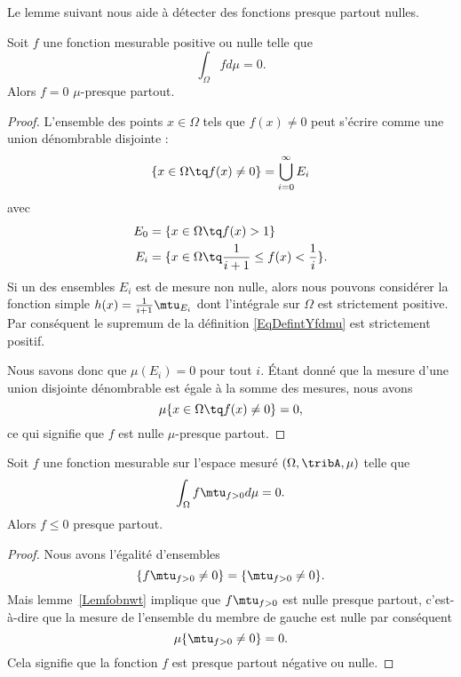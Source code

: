 Le lemme suivant nous aide à détecter des fonctions presque partout nulles.
\begin{lemma}   \label{Lemfobnwt}
	Soit \( f\) une fonction mesurable positive ou nulle telle que
	\begin{equation}
		\int_{\Omega}fd\mu=0.
	\end{equation}
	Alors \( f=0\) \( \mu\)-presque partout.
\end{lemma}

\begin{proof}
	L'ensemble des points \( x\in\Omega\) tels que \( f(x)\neq 0\) peut s'écrire comme une union dénombrable disjointe :
	\begin{equation}
		\{ x\in\Omega\tq f(x)\neq 0 \}=\bigcup_{i=0}^{\infty}E_i
	\end{equation}
	avec
	\begin{subequations}
		\begin{align}
			E_0 & =\{ x\in\Omega\tq f(x)>1 \}                                  \\
			E_i & =\{ x\in\Omega\tq \frac{1}{ i+1 }\leq f(x)<\frac{1}{ i } \}.
		\end{align}
	\end{subequations}
	Si un des ensembles \( E_i\) est de mesure non nulle, alors nous pouvons considérer la fonction simple \( h(x)=\frac{1}{ i+1 }\mtu_{E_i}\) dont l'intégrale sur \( \Omega\) est strictement positive. Par conséquent le supremum de la définition \eqref{EqDefintYfdmu} est strictement positif.

	Nous savons donc que \( \mu(E_i)=0\) pour tout \( i\). Étant donné que la mesure d'une union disjointe dénombrable est égale à la somme des mesures, nous avons
	\begin{equation}
		\mu\{ x\in\Omega\tq f(x)\neq 0 \}=0,
	\end{equation}
	ce qui signifie que \( f\) est nulle \( \mu\)-presque partout.
\end{proof}

\begin{corollary}   \label{CorjLYiSm}
	Soit \( f\) une fonction mesurable sur l'espace mesuré \( (\Omega,\tribA,\mu)\) telle que
	\begin{equation}
		\int_{\Omega}f\mtu_{f>0}d\mu=0.
	\end{equation}
	Alors \( f\leq 0\) presque partout.
\end{corollary}

\begin{proof}
	Nous avons l'égalité d'ensembles
	\begin{equation}
		\{ f\mtu_{f>0}\neq 0 \}=\{ \mtu_{f>0}\neq 0 \}.
	\end{equation}
	Mais lemme~\ref{Lemfobnwt} implique que \( f\mtu_{f>0}\) est nulle presque partout, c'est-à-dire que la mesure de l'ensemble du membre de gauche est nulle par conséquent
	\begin{equation}
		\mu\{ \mtu_{f>0}\neq 0 \}=0.
	\end{equation}
	Cela signifie que la fonction \( f\) est presque partout négative ou nulle.
\end{proof}

